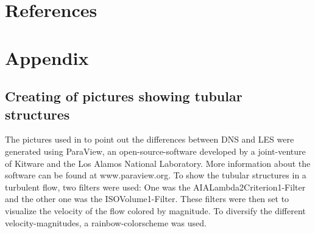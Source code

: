 \documentclass[11pt,a4paper,openany,oneside,parskip=half*]{article}
\begin{document}
\section{References}
\vspace*{-1.2cm}
\nocite{*} %
\pagebreak
\section{Appendix}
\subsection*{Creating of pictures showing tubular structures}
The pictures used in to point out the differences between DNS and LES were generated using ParaView, an open-source-software developed by a joint-venture of Kitware and the Los Alamos National Laboratory. More information about the software can be found at www.paraview.org. To show the tubular structures in a turbulent flow, two filters were used: One was the AIALambda2Criterion1-Filter and the other one was the ISOVolume1-Filter. These filters were then set to visualize the velocity of the flow colored by magnitude. To diversify the different velocity-magnitudes, a rainbow-colorscheme was used. 
\end{document}
